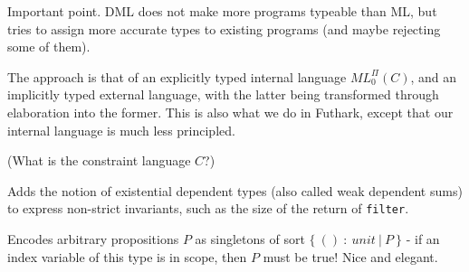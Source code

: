 \documentclass[a4paper, oneside, final]{memoir}
\begin{document}
Important point. DML does not make more programs typeable than ML, but
tries to assign more accurate types to existing programs (and maybe
rejecting some of them).

The approach is that of an explicitly typed internal language
$ML_{0}^{\Pi}(C)$, and an implicitly typed external language, with the
latter being transformed through elaboration into the former.  This is
also what we do in Futhark, except that our internal language is much
less principled.

(What is the constraint language $C$?)

Adds the notion of existential dependent types (also called weak
dependent sums) to express non-strict invariants, such as the size of
the return of \texttt{filter}.

Encodes arbitrary propositions $P$ as singletons of sort $\{\ ()\ :\
unit\ |\ P\ \}$ - if an index variable of this type is in scope, then
$P$ must be true!  Nice and elegant.
\end{document}
